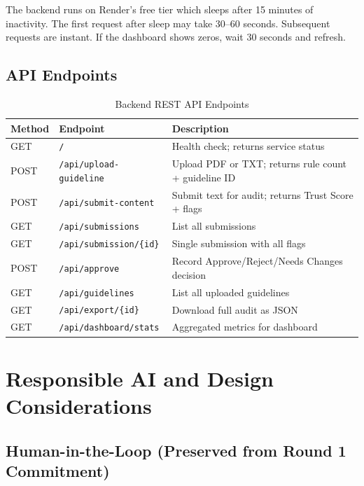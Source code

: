 \documentclass[11pt,a4paper]{article}
\begin{document}
\begin{tcolorbox}[colback=warningamber!20, colframe=warningamber!80, arc=2mm, boxrule=0.5pt, title=\textbf{Note on Cold Start}]
The backend runs on Render's free tier which sleeps after 15 minutes of inactivity. The first request after sleep may take 30--60 seconds. Subsequent requests are instant. If the dashboard shows zeros, wait 30 seconds and refresh.
\end{tcolorbox}

\subsection{API Endpoints}

\begin{table}[H]
\centering
\begin{tabular}{p{} p{} p{}}
\toprule
\textbf{Method} & \textbf{Endpoint} & \textbf{Description} \\
\midrule
GET & \texttt{/} & Health check; returns service status \\
POST & \texttt{/api/upload-guideline} & Upload PDF or TXT; returns rule count + guideline ID \\
POST & \texttt{/api/submit-content} & Submit text for audit; returns Trust Score + flags \\
GET & \texttt{/api/submissions} & List all submissions \\
GET & \texttt{/api/submission/\{id\}} & Single submission with all flags \\
POST & \texttt{/api/approve} & Record Approve/Reject/Needs Changes decision \\
GET & \texttt{/api/guidelines} & List all uploaded guidelines \\
GET & \texttt{/api/export/\{id\}} & Download full audit as JSON \\
GET & \texttt{/api/dashboard/stats} & Aggregated metrics for dashboard \\
\bottomrule
\end{tabular}
\caption{Backend REST API Endpoints}
\end{table}

\section{Responsible AI and Design Considerations}

\subsection{Human-in-the-Loop (Preserved from Round 1 Commitment)}
\end{document}
